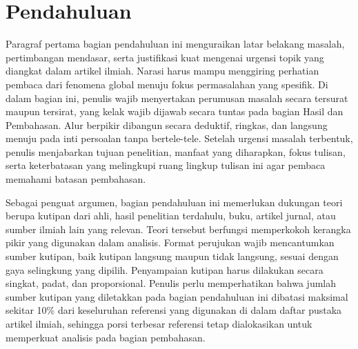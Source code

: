 \section{Pendahuluan}

Paragraf pertama bagian pendahuluan ini menguraikan latar belakang masalah, pertimbangan mendasar, serta justifikasi kuat mengenai urgensi topik yang diangkat dalam artikel ilmiah. Narasi harus mampu menggiring perhatian pembaca dari fenomena global menuju fokus permasalahan yang spesifik. Di dalam bagian ini, penulis wajib menyertakan perumusan masalah secara tersurat maupun tersirat, yang kelak wajib dijawab secara tuntas pada bagian Hasil dan Pembahasan. Alur berpikir dibangun secara deduktif, ringkas, dan langsung menuju pada inti persoalan tanpa bertele-tele. Setelah urgensi masalah terbentuk, penulis menjabarkan tujuan penelitian, manfaat yang diharapkan, fokus tulisan, serta keterbatasan yang melingkupi ruang lingkup tulisan ini agar pembaca memahami batasan pembahasan.

Sebagai penguat argumen, bagian pendahuluan ini memerlukan dukungan teori berupa kutipan dari ahli, hasil penelitian terdahulu, buku, artikel jurnal, atau sumber ilmiah lain yang relevan. Teori tersebut berfungsi memperkokoh kerangka pikir yang digunakan dalam analisis. Format perujukan wajib mencantumkan sumber kutipan, baik kutipan langsung maupun tidak langsung, sesuai dengan gaya selingkung yang dipilih. Penyampaian kutipan harus dilakukan secara singkat, padat, dan proporsional. Penulis perlu memperhatikan bahwa jumlah sumber kutipan yang diletakkan pada bagian pendahuluan ini dibatasi maksimal sekitar 10\% dari keseluruhan referensi yang digunakan di dalam daftar pustaka artikel ilmiah, sehingga porsi terbesar referensi tetap dialokasikan untuk memperkuat analisis pada bagian pembahasan.